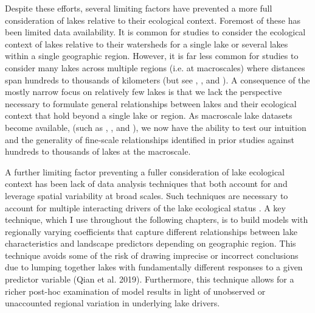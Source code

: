 \documentclass[]{msu-thesis}
\theoremstyle{definition}
\theoremstyle{definition}
\theoremstyle{definition}
\theoremstyle{remark}
\begin{document}
Despite these efforts, several limiting factors have prevented a more full consideration of lakes relative to their ecological context. Foremost of these has been limited data availability.  It is common for studies to consider the ecological context of lakes relative to their watersheds for a single lake or several lakes within a single geographic region. However, it is far less common for studies to consider many lakes across multiple regions (i.e. at macroscales) where distances span hundreds to thousands of kilometers (but see \citet{usepa1975}, \citet{landers1988eastern}, and \citet{usepa_nla2012}). A consequence of the mostly narrow focus on relatively few lakes is that we lack the perspective necessary to formulate general relationships between lakes and their ecological context that hold beyond a single lake or region. As macroscale lake datasets become available, (such as \citet{sorannoLAGOSNEMultiscaledGeospatial2017}, \citet{readWaterQualityData2017}, and \citet{williamsDatabaseGeoreferencedNutrient2017}), we now have the ability to test our intuition and the generality of fine-scale relationships identified in prior studies against hundreds to thousands of lakes at the macroscale.\par

A further limiting factor preventing a fuller consideration of lake ecological context has been lack of data analysis techniques that both account for and leverage spatial variability at broad scales. Such techniques are necessary to account for multiple interacting drivers of the lake ecological status \citep{allanLandscapesRiverscapesInfluence2004}. A key technique, which I use throughout the following chapters, is to build models with regionally varying coefficients that capture different relationships between lake characteristics and landscape predictors depending on geographic region. This technique avoids some of the risk of drawing imprecise or incorrect conclusions due to lumping together lakes with fundamentally different responses to a given predictor variable (Qian et al. 2019). Furthermore, this technique allows for a richer post-hoc examination of model results in light of unobserved or unaccounted regional variation in underlying lake drivers.\par
\end{document}
